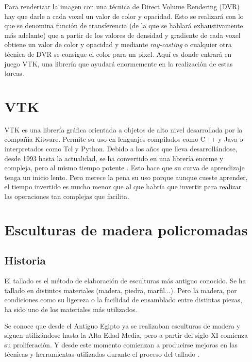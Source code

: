 Para renderizar la imagen con una técnica de Direct Volume Rendering (DVR) hay que darle a cada voxel un valor de color y opacidad. Esto se realizará con lo que se denomina función de transferencia (de la que se hablará exhaustivamente más adelante) que a partir de los valores de densidad y gradiente de cada voxel obtiene un valor de color y opacidad y mediante \textit{ray-casting} o cualquier otra técnica de DVR se consigue el color para un pixel. Aquí es donde entrará en juego VTK, una librería que ayudará enormemente en la realización de estas tareas.

\section{VTK} 

VTK es una librería gráfica orientada a objetos de alto nivel desarrollada por la compañía Kitware. Permite su uso en lenguajes compilados como C++ y Java o interpretados como Tcl y Python. Debido a los años que lleva desarrollándose, desde 1993 hasta la actualidad, se ha convertido en una librería enorme y compleja, pero al mismo tiempo potente \cite{intro_medical_vtk_bioimage}. Esto hace que su curva de aprendizaje tenga un inicio lento. Pero merece la pena su uso porque aunque cueste aprender, el tiempo invertido es mucho menor que al que habría que invertir para realizar las operaciones tan complejas que facilita.

\section{Esculturas de madera policromadas}

\subsection{Historia}

El tallado es el método de elaboración de esculturas más antiguo conocido. Se ha tallado en distintos materiales (madera, piedra, marfil...). Pero la madera, por condiciones como su ligereza o la facilidad de ensamblado entre distintas piezas, ha sido uno de los materiales más utilizados.

Se conoce que desde el Antiguo Egipto ya se realizaban esculturas de madera y siguen utilizándose hasta la Alta Edad Media, pero a partir del siglo XI comienza su proliferación. Y desde este momento comienzan a producirse mejoras en las técnicas y herramientas utilizadas durante el proceso del tallado \cite{tc_esculturas}.

